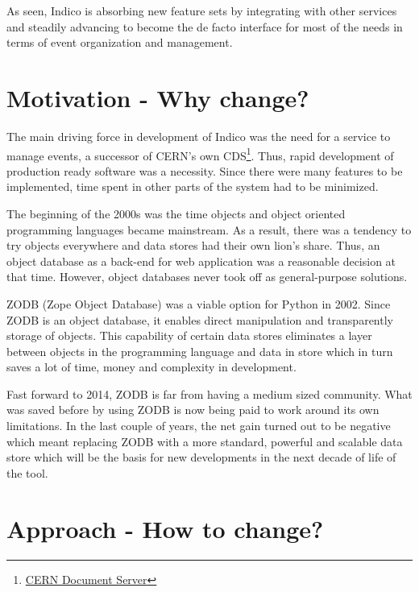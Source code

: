 As seen, Indico is absorbing new feature sets by integrating with other services and steadily advancing to become the de facto interface for most of the needs in terms of event organization and management.

\section{Motivation - Why change?}

\par The main driving force in development of Indico was the need for a service to manage events, a successor of CERN's own CDS\footnote{\href{http://cds.cern.ch/?ln=en}{CERN Document Server}}. Thus, rapid development of production ready software was a necessity. Since there were many features to be implemented, time spent in other parts of the system had to be minimized.

\par The beginning of the 2000s was the time objects and object oriented programming languages became mainstream. As a result, there was a tendency to try objects everywhere and data stores had their own lion's share. Thus, an object database as a back-end for web application was a reasonable decision at that time. However, object databases never took off as general-purpose solutions.

\par \textsc{ZODB} (Zope Object Database) was a viable option for Python in 2002. Since \textsc{ZODB} is an object database, it enables direct manipulation and transparently storage of objects. This capability of certain data stores eliminates a layer between objects in the programming language and data in store which in turn saves a lot of time, money and complexity in development.

\par Fast forward to 2014, \textsc{ZODB} is far from having a medium sized community. What was saved before by using \textsc{ZODB} is now being paid to work around its own limitations. In the last couple of years, the net gain turned out to be negative which meant replacing \textsc{ZODB} with a more standard, powerful and scalable data store which will be the basis for new developments in the next decade of life of the tool.

\section{Approach - How to change?}

